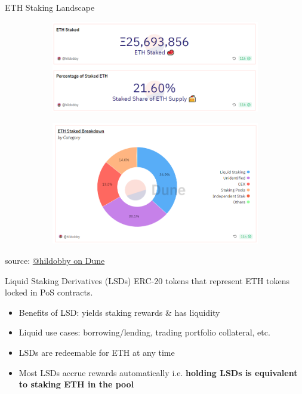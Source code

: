 \documentclass{beamer}
\begin{document}
\begin{frame}{ETH Staking Landscape}
    \begin{figure}
        \centering
        \begin{subfigure}[b]{0.45\textwidth}
            \centering
            \includegraphics[width=\textwidth]{figures/eth_stake_stats.png}
        \end{subfigure}
        \begin{subfigure}[b]{0.45\textwidth}
            \centering
            \includegraphics[width=\textwidth]{figures/eth_stake_breakdown.png}
        \end{subfigure}
    \end{figure}
    \tiny{source: \href{https://dune.com/hildobby/eth2-staking}{@hildobby on Dune}}

\end{frame}

\begin{frame}{Liquid Staking Derivatives (LSDs)}
    ERC-20 tokens that represent ETH tokens locked in PoS contracts. 
    \begin{itemize}
        \item Benefits of LSD: yields staking rewards \& has liquidity
        \item Liquid use cases: borrowing/lending, trading portfolio collateral, etc.
        \item LSDs are redeemable for ETH at any time
        \item Most LSDs accrue rewards automatically i.e. \textbf{holding LSDs is equivalent to staking ETH in the pool}
    \end{itemize}
    \bigskip
    
\end{frame}
\end{document}
